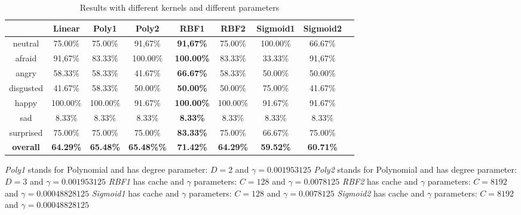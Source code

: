 \begin{table}[h]
\begin{center}
   \caption{\label{table_results_kernels_weight} Results with different kernels and different parameters}
\begin{tabular}{|c|c|c|c|c|c|c|c|c|}
  \hline
    & Linear & \textbf{Poly1} & Poly2 & RBF1 & RBF2 & Sigmoid1 & Sigmoid2 \\
  \hline
  neutral & 75.00\% & 75.00\% & 91,67\% & \textbf{91,67\%} & 75.00\% & 100.00\% & 66.67\% \\
  afraid & 91,67\% & 83.33\% & 100.00\% & \textbf{100.00\%} & 83.33\% & 33.33\% & 91,67\% \\
  angry & 58.33\% & 58.33\% & 41.67\% & \textbf{66.67\%} & 58.33\% & 50.00\% & 50.00\% \\
  disgusted & 41.67\% & 58.33\% & 50.00\% & \textbf{50.00\%} & 50.00\% & 75.00\% & 41.67\% \\
  happy & 100.00\% & 100.00\% & 91.67\% & \textbf{100.00\%} & 100.00\% & 91.67\% & 91.67\% \\
  sad & 8.33\% & 8.33\% & 8.33\% & \textbf{8.33\%} & 8.33\% & 8.33\% & 8.33\% \\
  surprised & 75.00\% & 75.00\% & 75.00\% & \textbf{83.33\%} & 75.00\% & 66.67\% & 75.00\% \\
  \textbf{overall} & \textbf{64.29\%} & \textbf{65.48\%} & \textbf{{65.48\%}\%} & \textbf{{\color{red}71.42\%}} & \textbf{64.29\%} & \textbf{59.52\%} & \textbf{60.71\%} \\
  \hline
\end{tabular}
\end{center} 
\end{table}

\noindent \textit{Poly1} stands for Polynomial and has degree parameter: $ D = 2 $ and $ \gamma = 0.001953125 $
\newline
\noindent \textit{Poly2} stands for Polynomial and has degree parameter: $ D = 3 $ and $ \gamma = 0.001953125 $
\newline
\noindent \textit{RBF1} has cache and $\gamma$ parameters: $ C = 128 $ and $ \gamma = 0.0078125 $
\newline
\noindent \textit{RBF2} has cache and $\gamma$ parameters: $ C = 8192 $ and $ \gamma = 0.00048828125 $ 
\newline
\noindent \textit{Sigmoid1} has cache and $\gamma$ parameters: $ C = 128 $ and $ \gamma = 0.0078125 $
\newline
\noindent \textit{Sigmoid2} has cache and $\gamma$ parameters: $ C = 8192 $ and $ \gamma = 0.00048828125 $
\newline

